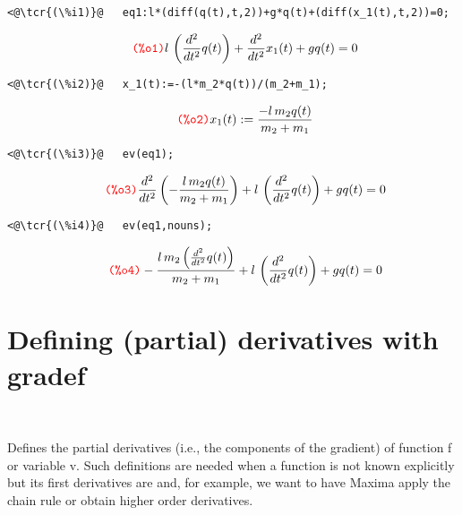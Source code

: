 \documentclass[../Maxima_Workbook.tex]{subfiles}
\begin{document}
\lz \begin{small}
\color{blue} \leqn
\begin{lstlisting}
<@\tcr{(\%i1)}@   eq1:l*(diff(q(t),t,2))+g*q(t)+(diff(x_1(t),t,2))=0;
\end{lstlisting}
\vspace{-4mm} \[\tag*{\tcr{\ttfamily (\%o1)}} l\, \left( \frac{{{d}^{2}}}{d {{t}^{2}}} q(t)\right) +\frac{{{d}^{2}}}{d {{t}^{2}}} {x_1}(t)+g q(t)=0\]
\vspace{-5mm} \begin{lstlisting}
<@\tcr{(\%i2)}@   x_1(t):=-(l*m_2*q(t))/(m_2+m_1);
\end{lstlisting}
\vspace{-4mm} \[\tag*{\tcr{\ttfamily (\%o2)}} {x_1}(t):=\frac{-l\, {m_2} q(t)}{{m_2}+{m_1}} \]
\vspace{-7mm} \begin{lstlisting}
<@\tcr{(\%i3)}@   ev(eq1);
\end{lstlisting}
\vspace{-5mm} \[\tag*{\tcr{\ttfamily (\%o3)}} \frac{{{d}^{2}}}{d {{t}^{2}}} \left( -\frac{l\, {m_2} q(t)}{{m_2}+{m_1}}\right) +l\, \left( \frac{{{d}^{2}}}{d {{t}^{2}}} q(t)\right) +g q(t)=0 \]
\vspace{-7mm} \begin{lstlisting}
<@\tcr{(\%i4)}@   ev(eq1,nouns);
\end{lstlisting}
\vspace{-5mm} \[\tag*{\tcr{\ttfamily (\%o4)}} -\frac{l\, {m_2} \left( \frac{{{d}^{2}}}{d {{t}^{2}}} q(t)\right) }{{m_2}+{m_1}}+l\, \left( \frac{{{d}^{2}}}{d {{t}^{2}}} q(t)\right) +g q(t)=0 \]
\color{black} \reqn
\end{small} \vspace{-4mm}

\section{Defining (partial) derivatives with gradef}

\lz {} \\
 \hfill \tcr{[function]}

\lz Defines the partial derivatives (i.e., the components of the gradient) of function f or variable v. Such definitions are needed when a function is not known explicitly but its first derivatives are and, for example, we want to have Maxima apply the chain rule or obtain higher order derivatives.
\end{document}
